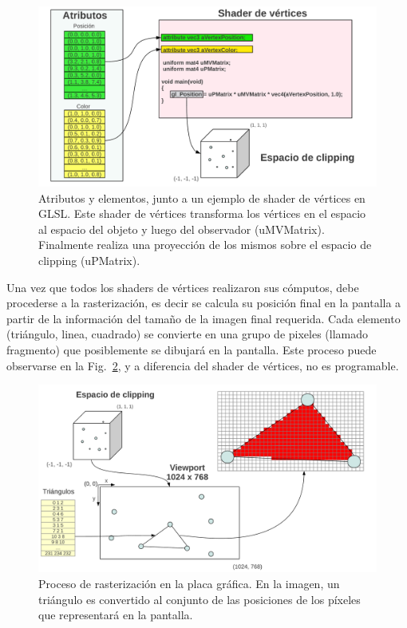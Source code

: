 \begin{figure}[h]
\begin{center}
\includegraphics[width=13cm]{figures/vertexshader}
\end{center}
\caption[Atributos y elementos, junto a un ejemplo de shader de vértices en GLSL.]{Atributos y elementos, junto a un ejemplo de shader de vértices en GLSL. Este shader de vértices transforma los vértices en el espacio al espacio del objeto y luego del observador (uMVMatrix). Finalmente realiza una proyección de los mismos sobre el espacio de clipping (uPMatrix).}
\label{fg:vertexshader}
\end{figure}

Una vez que todos los shaders de vértices realizaron sus cómputos, debe procederse a la rasterización, es decir se calcula su posición final en la pantalla a partir de la información del tamaño de la imagen final requerida.
Cada elemento (triángulo, linea, cuadrado) se convierte en una grupo de pixeles (llamado fragmento) que posiblemente se dibujará en la pantalla.
Este proceso puede observarse en la Fig.~\ref{fg:raster}, y a diferencia del shader de vértices, no es programable.


\begin{figure}[h]
\begin{center}
\includegraphics[width=13cm]{figures/raster}
\end{center}
\caption[Proceso de rasterización en la placa gráfica]{Proceso de rasterización en la placa gráfica. En la imagen, un triángulo es convertido al conjunto de las posiciones de los píxeles que representará en la pantalla.}
\label{fg:raster}
\end{figure}

